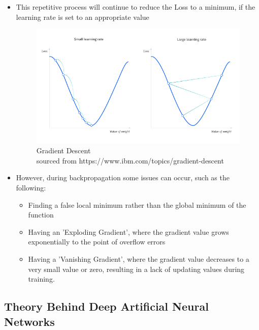 \documentclass[./project-report/src/latex/project-report.tex]{subfiles}
\begin{document}
\begin{itemize}
\begin{itemize}
\begin{itemize}
            \item This repetitive process will continue to reduce the Loss to a minimum, if the learning rate is set to an appropriate value
                \begin{figure}[h!]
                \centering
                \includegraphics[width=1\textwidth]{./project-report/src/images/gradient-descent.png}
                \caption{Gradient Descent\\
                        sourced from https://www.ibm.com/topics/gradient-descent}
                \end{figure}
            \item However, during backpropagation some issues can occur, such as the following:
            \begin{itemize}
                \item Finding a false local minimum rather than the global minimum of the function
                \item Having an 'Exploding Gradient', where the gradient value grows exponentially to the point of overflow errors
                \item Having a 'Vanishing Gradient', where the gradient value decreases to a very small value or zero, resulting in a lack of updating values during 
                      training.
            \end{itemize}
        \end{itemize}
    \end{itemize}
\end{itemize}

\vspace{5mm}
\subsection{Theory Behind Deep Artificial Neural Networks}
\vspace{5mm}
\end{document}
